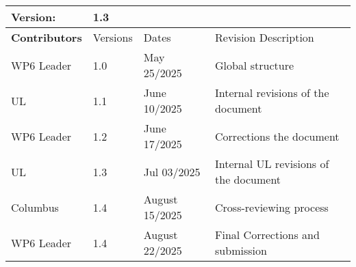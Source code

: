 \begin{tabular}{ >{\raggedright\arraybackslash}p{3cm}| p{2cm} p{4cm} p{6cm} }
    \toprule
    \textbf{Version}: & \multicolumn{3}{l}{ 1.3} \\ \midrule
    \textbf{Contributors}  & Versions    & Dates       & Revision Description \\ \midrule
    WP6 Leader  & 1.0    & May 25/2025  & Global structure  \\ 
    UL  & 1.1    & June 10/2025  & Internal revisions of the document  \\ 
    WP6 Leader  & 1.2    & June 17/2025  & Corrections the document  \\ 
    UL  & 1.3    & Jul 03/2025  & Internal UL revisions of the document  \\ 
    Columbus  & 1.4   & August 15/2025  & Cross-reviewing process   \\ 
    WP6 Leader  & 1.4   & August 22/2025  & Final Corrections and submission  \\ 
    \bottomrule
\end{tabular}  
